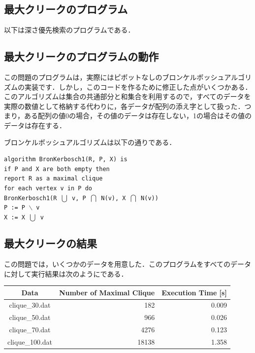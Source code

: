 \documentclass[a4j, titlepage]{jarticle}
\begin{document}
    \subsection{最大クリークのプログラム}
    以下は深さ優先検索のプログラムである．
     
        
    \subsection{最大クリークのプログラムの動作}
    この問題のプログラムは，実際にはピボットなしのブロンケルボッシュアルゴリズムの実装です．しかし，このコードを作るために修正した点がいくつかある．このアルゴリズムは集合の共通部分と和集合を利用するので，すべてのデータを実際の数値として格納する代わりに，各データが配列の添え字として扱った．つまり，ある配列の値0の場合，その値のデータは存在しない，1の場合はその値のデータは存在する．

    ブロンケルボッシュアルゴリズムは以下の通りである．
    \begin{shadebox}
        \texttt{algorithm BronKerbosch1(R, P, X) is \\
        \hspace{10pt} if P and X are both empty then \\
        \hspace{30pt} report R as a maximal clique \\
        \hspace{10pt} for each vertex v in P do \\
        \hspace{30pt} BronKerbosch1(R $\bigcup$ {v}, P $\bigcap$ N(v), X $\bigcap$ N(v)) \\
        \hspace{30pt} P := P $\backslash$ {v} \\
        \hspace{30pt} X := X $\bigcup$ {v}
        }
    \end{shadebox}
   
    
    \subsection{最大クリークの結果}
    この問題では，いくつかのデータを用意した．このプログラムをすべてのデータに対して実行結果は次のようにである． %
    \begin{longtable}[c]{|c|r|r|}
        \hline
        \rowcolor[HTML]{C0C0C0} 
        \cellcolor[HTML]{C0C0C0}Data & \multicolumn{1}{c|}{\cellcolor[HTML]{C0C0C0}Number of Maximal Clique} & \multicolumn{1}{c|}{\cellcolor[HTML]{C0C0C0}Execution Time [s]} \\ \hline
        \endfirsthead
        \endhead
        clique\_30.dat   & 182       & 0.009       \\ \hline
        clique\_50.dat   & 966       & 0.026       \\ \hline
        clique\_70.dat   & 4276      & 0.123       \\ \hline
        clique\_100.dat  & 18138     & 1.358       \\ \hline
    \end{longtable}
    
\end{document}
